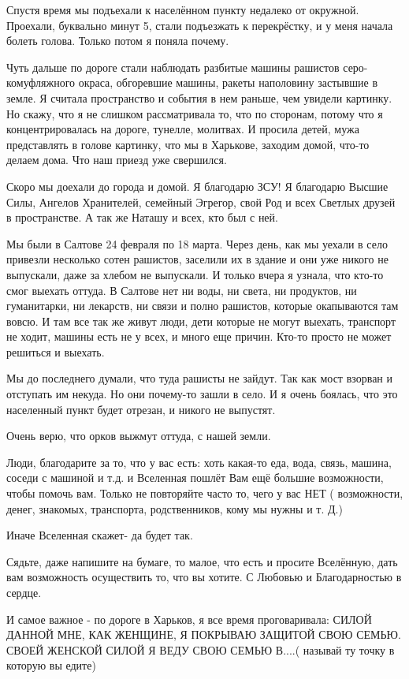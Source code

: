 Спустя время мы подъехали к населённом  пункту  недалеко от окружной. Проехали,
буквально минут 5, стали подъезжать к перекрёстку,  и у меня начала болеть
голова. Только потом я поняла почему.

Чуть дальше по дороге стали наблюдать разбитые машины рашистов
серо-комуфляжного окраса, обгоревшие машины, ракеты наполовину застывшие в
земле. Я считала пространство  и события в нем раньше, чем увидели картинку.
Но скажу, что я не слишком рассматривала то, что по сторонам, потому что я
концентрировалась  на дороге, тунелле, молитвах. И просила детей, мужа
представлять в голове картинку, что мы в Харькове, заходим домой, что-то делаем
дома.  Что наш приезд уже свершился.

Скоро мы доехали до города и домой. Я благодарю ЗСУ!  Я  благодарю Высшие Силы,
Ангелов Хранителей, семейный Эгрегор, свой Род и всех Светлых друзей в
пространстве. А так же Наташу и всех, кто был с ней.

Мы были в Салтове 24 февраля по 18 марта. Через день, как мы уехали в село
привезли несколько сотен рашистов, заселили их в здание и они уже никого не
выпускали, даже за хлебом не выпускали. И только вчера  я узнала, что кто-то
смог выехать оттуда. В Салтове нет ни воды, ни света, ни продуктов, ни
гуманитарки,  ни лекарств, ни связи и полно рашистов, которые окапываются там
вовсю. И там все так же живут люди, дети которые не могут выехать, транспорт не
ходит, машины  есть не у всех, и много еще причин. Кто-то просто не может
решиться и выехать.

Мы до последнего думали, что туда рашисты не зайдут. Так как мост взорван и
отступать им некуда. Но они почему-то зашли в село. И я очень боялась, что это
населенный пункт будет отрезан, и никого не выпустят.

Очень верю, что орков выжмут оттуда, с нашей земли.

Люди, благодарите за то, что у вас есть: хоть какая-то еда, вода, связь,
машина, соседи с машиной и т.д. и Вселенная пошлёт Вам ещё большие возможности,
чтобы помочь вам.  Только не повторяйте часто то, чего у вас НЕТ ( возможности,
денег, знакомых, транспорта, родственников, кому мы нужны и т. Д.)

Иначе Вселенная скажет- да будет так. 

Сядьте, даже напишите на бумаге, то малое, что есть и просите Вселённую,  дать
вам возможность осуществить то, что вы хотите.  С Любовью и Благодарностью  в
сердце.

И самое важное -  по дороге в Харьков, я все время проговаривала: СИЛОЙ ДАННОЙ
МНЕ, КАК ЖЕНЩИНЕ, Я ПОКРЫВАЮ ЗАЩИТОЙ СВОЮ СЕМЬЮ. СВОЕЙ ЖЕНСКОЙ СИЛОЙ Я ВЕДУ
СВОЮ СЕМЬЮ В....( называй ту точку в которую вы едите)


